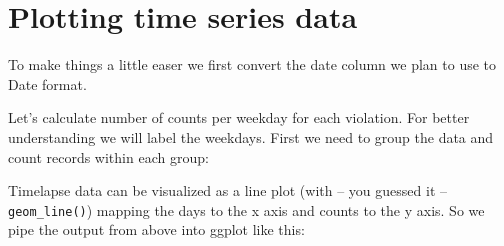 \documentclass[]{book}
\newenvironment{Shaded}{\begin{snugshade}}{\end{snugshade}}
\newcommand{\KeywordTok}[1]{\textcolor[rgb]{0.13,0.29,0.53}{\textbf{#1}}}
\newcommand{\DataTypeTok}[1]{\textcolor[rgb]{0.13,0.29,0.53}{#1}}
\newcommand{\StringTok}[1]{\textcolor[rgb]{0.31,0.60,0.02}{#1}}
\newcommand{\OtherTok}[1]{\textcolor[rgb]{0.56,0.35,0.01}{#1}}
\newcommand{\OperatorTok}[1]{\textcolor[rgb]{0.81,0.36,0.00}{\textbf{#1}}}
\newcommand{\NormalTok}[1]{#1}
\theoremstyle{definition}
\theoremstyle{definition}
\theoremstyle{definition}
\theoremstyle{remark}
\begin{document}
\section{Plotting time series data}\label{plotting-time-series-data}

To make things a little easer we first convert the date column we plan
to use to Date format.

\begin{Shaded}
\end{Shaded}

Let's calculate number of counts per weekday for each violation. For
better understanding we will label the weekdays. First we need to group
the data and count records within each group:

\begin{Shaded}
\end{Shaded}

Timelapse data can be visualized as a line plot (with -- you guessed it
-- \texttt{geom\_line()}) mapping the days to the x axis and counts to
the y axis. So we pipe the output from above into ggplot like this:

\begin{Shaded}
\end{Shaded}
\end{document}
